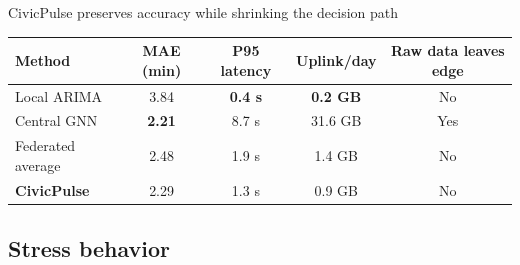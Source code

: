 \begin{frame}{CivicPulse preserves accuracy while shrinking the decision path}
  \centering
  \small
  \setlength{\tabcolsep}{7pt}
  \begin{tabular}{@{}lcccc@{}}
    \toprule
    \textbf{Method} & \textbf{MAE (min)} & \textbf{P95 latency} & \textbf{Uplink/day} & \textbf{Raw data leaves edge} \\
    \midrule
    Local ARIMA & 3.84 & \textbf{0.4 s} & \textbf{0.2 GB} & No \\
    Central GNN & \textbf{2.21} & 8.7 s & 31.6 GB & Yes \\
    Federated average & 2.48 & 1.9 s & 1.4 GB & No \\
    \rowcolor{PulseTeal!12}
    \textbf{CivicPulse} & 2.29 & 1.3 s & 0.9 GB & No \\
    \bottomrule
  \end{tabular}

  \vspace{0.55cm}
\end{frame}

\subsection{Stress behavior}

